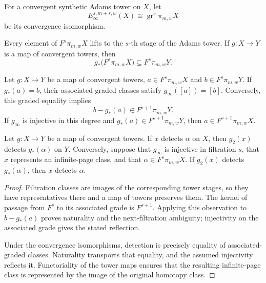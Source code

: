 \begin{theorem}
\label{sem:ProofTools:filtration-representatives}
For a convergent synthetic Adams tower on $X$, let
\[E_\infty^{s,m+s,w}(X)\cong\operatorname{gr}^s\pi_{m,w}X\]
be its convergence isomorphism.

Every element of $F^s\pi_{m,w}X$ lifts to the $s$-th stage of the Adams tower. If $g:X\to Y$ is a map of convergent towers, then
\[g_*\bigl(F^s\pi_{m,w}X\bigr)\subseteq F^s\pi_{m,w}Y.\]

Let $g:X\to Y$ be a map of convergent towers, $a\in F^s\pi_{m,w}X$ and $b\in F^s\pi_{m,w}Y$. If $g_*(a)=b$, their associated-graded classes satisfy $g_\infty([a])=[b]$. Conversely, this graded equality implies
\[b-g_*(a)\in F^{s+1}\pi_{m,w}Y.\]
If $g_\infty$ is injective in this degree and $g_*(a)\in F^{s+1}\pi_{m,w}Y$, then $a\in F^{s+1}\pi_{m,w}X$.

Let $g:X\to Y$ be a map of convergent towers. If $x$ detects $\alpha$ on $X$, then $g_2(x)$ detects $g_*(\alpha)$ on $Y$. Conversely, suppose that $g_\infty$ is injective in filtration $s$, that $x$ represents an infinite-page class, and that $\alpha\in F^s\pi_{m,w}X$. If $g_2(x)$ detects $g_*(\alpha)$, then $x$ detects $\alpha$.
\end{theorem}
\begin{proof}
Filtration classes are images of the corresponding tower stages, so they have representatives there and a map of towers preserves them. The kernel of passage from $F^s$ to its associated grade is $F^{s+1}$. Applying this observation to $b-g_*(a)$ proves naturality and the next-filtration ambiguity; injectivity on the associated grade gives the stated reflection.

Under the convergence isomorphisms, detection is precisely equality of associated-graded classes. Naturality transports that equality, and the assumed injectivity reflects it. Functoriality of the tower maps ensures that the resulting infinite-page class is represented by the image of the original homotopy class.
\end{proof}

